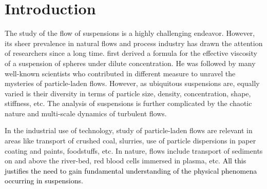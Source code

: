 \documentclass{jfm}
\def\sz#1{{\textcolor{black}{#1}}}
\begin{document}
\section{Introduction}\label{sec:Introduction}
The study of the flow of suspensions is a highly challenging endeavor. However, its sheer prevalence in natural flows and process industry has drawn the attention of researchers since a long time. \citet{einstein1906neue,einstein1911berichtigung} first derived a formula for the effective viscosity of a suspension of spheres under dilute concentration. He was followed by many well-known scientists who contributed in different measure to unravel the mysteries of particle-laden flows. However, as ubiquitous suspensions are, equally varied is their diversity in terms of particle size, density, concentration, shape, stiffness, etc. The analysis of suspensions is further complicated by the chaotic nature and multi-scale dynamics of turbulent flows.

In the industrial use of technology, study of particle-laden flows are relevant in areas like transport of crushed coal, slurries, use of particle dispersions in paper coating and paints, foodstuffs, etc. In nature, flows include transport of sediments on and above the river-bed, red blood cells immersed in plasma, etc. \sz{All this justifies the need to gain fundamental understanding of the physical phenomena occurring in suspensions.}
\end{document}

